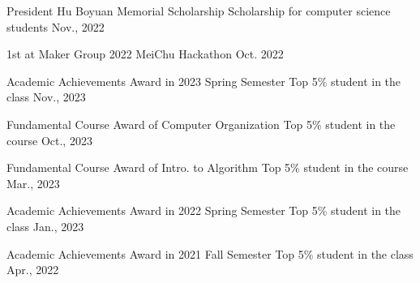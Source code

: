 



\begin{cvhonors}
%

\cvhonor
{President Hu Boyuan Memorial Scholarship} 
{Scholarship for computer science students} 
{} 
{Nov., 2022}


\cvhonor
{1st at Maker Group} 
{2022 MeiChu Hackathon} 
{} 
{Oct. 2022}


%

\end{cvhonors}




\begin{cvhonors}



\cvhonor
{Academic Achievements Award in 2023 Spring Semester} 
{Top 5\% student in the class} 
{} 
{Nov., 2023}

\cvhonor
{Fundamental Course Award of Computer Organization}
{Top 5\% student in the course} 
{} 
{Oct., 2023}

\cvhonor
{Fundamental Course Award of Intro. to Algorithm} 
{Top 5\% student in the course} 
{} 
{Mar., 2023}


\cvhonor
{Academic Achievements Award in 2022 Spring Semester} 
{Top 5\% student in the class} 
{} 
{Jan., 2023}



\cvhonor
{Academic Achievements Award in 2021 Fall Semester} 
{Top 5\% student in the class} 
{} 
{Apr., 2022}

\end{cvhonors}